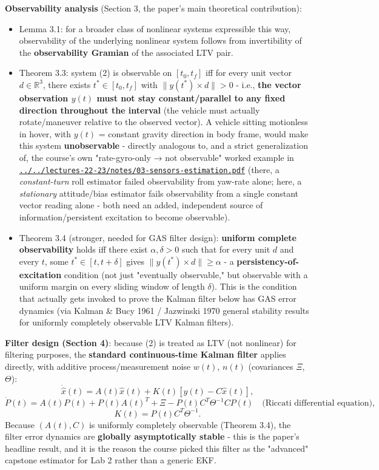 \documentclass[11pt]{article}
\begin{document}
\textbf{Observability analysis} (Section 3, the paper's main theoretical contribution):
\begin{itemize}
\item Lemma 3.1: for a broader class of nonlinear systems expressible this way, observability of the underlying nonlinear system follows from invertibility of the \textbf{observability Gramian} of the associated LTV pair.
\item Theorem 3.3: system (2) is observable on $[t_0,t_f]$ iff for every unit vector $d \in \mathbb{R}^3$, there exists $t^* \in [t_0,t_f]$ with $\|y(t^*)\times d\| > 0$ - i.e., \textbf{the vector observation $y(t)$ must not stay constant/parallel to any fixed direction throughout the interval} (the vehicle must actually rotate/maneuver relative to the observed vector). A vehicle sitting motionless in hover, with $y(t)$ = constant gravity direction in body frame, would make this system \textbf{unobservable} - directly analogous to, and a strict generalization of, the course's own "rate-gyro-only → not observable" worked example in \href{../../lectures-22-23/notes/03-sensors-estimation.pdf}{\texttt{../../lectures-22-23/notes/03-\allowbreak{}sensors-\allowbreak{}estimation.pdf}} (there, a \textit{constant-turn} roll estimator failed observability from yaw-rate alone; here, a \textit{stationary} attitude/bias estimator fails observability from a single constant vector reading alone - both need an added, independent source of information/persistent excitation to become observable).
\item Theorem 3.4 (stronger, needed for GAS filter design): \textbf{uniform complete observability} holds iff there exist $\alpha,\delta>0$ such that for every unit $d$ and every $t$, some $t^* \in [t,t+\delta]$ gives $\|y(t^*)\times d\| \geq \alpha$ - a \textbf{persistency-of-excitation} condition (not just "eventually observable," but observable with a uniform margin on every sliding window of length $\delta$). This is the condition that actually gets invoked to prove the Kalman filter below has GAS error dynamics (via Kalman \& Bucy 1961 / Jazwinski 1970 general stability results for uniformly completely observable LTV Kalman filters).
\end{itemize}

\textbf{Filter design (Section 4)}: because (2) is treated as LTV (not nonlinear) for filtering purposes, the \textbf{standard continuous-time Kalman filter} applies directly, with additive process/measurement noise $w(t)$, $n(t)$ (covariances $\Xi$, $\Theta$):
\[
\dot{\hat x}(t) = A(t)\hat x(t) + K(t)[y(t) - C\hat x(t)],
\]
\[
\dot P(t) = A(t)P(t) + P(t)A(t)^T + \Xi - P(t)C^T\Theta^{-1}CP(t) \quad \text{(Riccati differential equation)},
\]
\[
K(t) = P(t)C^T\Theta^{-1}.
\]
Because $(A(t),C)$ is uniformly completely observable (Theorem 3.4), the filter error dynamics are \textbf{globally asymptotically stable} - this is the paper's headline result, and it is the reason the course picked this filter as the "advanced" capstone estimator for Lab 2 rather than a generic EKF.
\end{document}
